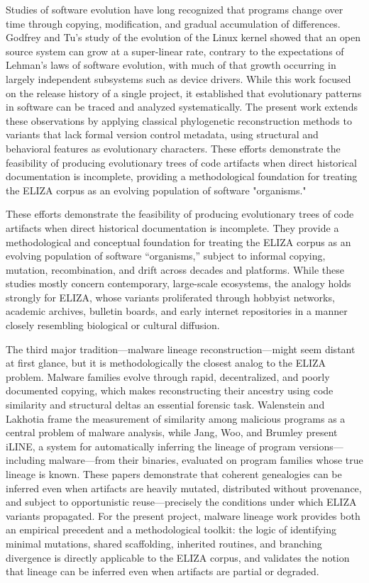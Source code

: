 \documentclass{article}
\begin{document}
Studies of software evolution have long recognized that programs change over time through copying, modification, and gradual accumulation of differences. Godfrey and Tu's study of the evolution of the Linux kernel \cite{Godfrey2000} showed that an open source system can grow at a super-linear rate, contrary to the expectations of Lehman's laws of software evolution, with much of that growth occurring in largely independent subsystems such as device drivers. While this work focused on the release history of a single project, it established that evolutionary patterns in software can be traced and analyzed systematically. The present work extends these observations by applying classical phylogenetic reconstruction methods to variants that lack formal version control metadata, using structural and behavioral features as evolutionary characters. These efforts demonstrate the feasibility of producing evolutionary trees of code artifacts when direct historical documentation is incomplete, providing a methodological foundation for treating the ELIZA corpus as an evolving population of software "organisms."

These efforts demonstrate the feasibility of producing evolutionary trees of code artifacts when direct historical documentation is incomplete. They provide a methodological and conceptual foundation for treating the ELIZA corpus as an evolving population of software “organisms,” subject to informal copying, mutation, recombination, and drift across decades and platforms. While these studies mostly concern contemporary, large-scale ecosystems, the analogy holds strongly for ELIZA, whose variants proliferated through hobbyist networks, academic archives, bulletin boards, and early internet repositories in a manner closely resembling biological or cultural diffusion.

The third major tradition—malware lineage reconstruction—might seem distant at first glance, but it is methodologically the closest analog to the ELIZA problem. Malware families evolve through rapid, decentralized, and poorly documented copying, which makes reconstructing their ancestry using code similarity and structural deltas an essential forensic task. Walenstein and Lakhotia \cite{walenstein2007software} frame the measurement of similarity among malicious programs as a central problem of malware analysis, while Jang, Woo, and Brumley \cite{jang2013lineage} present iLINE, a system for automatically inferring the lineage of program versions---including malware---from their binaries, evaluated on program families whose true lineage is known. These papers demonstrate that coherent genealogies can be inferred even when artifacts are heavily mutated, distributed without provenance, and subject to opportunistic reuse—precisely the conditions under which ELIZA variants propagated. For the present project, malware lineage work provides both an empirical precedent and a methodological toolkit: the logic of identifying minimal mutations, shared scaffolding, inherited routines, and branching divergence is directly applicable to the ELIZA corpus, and validates the notion that lineage can be inferred even when artifacts are partial or degraded.
\end{document}
